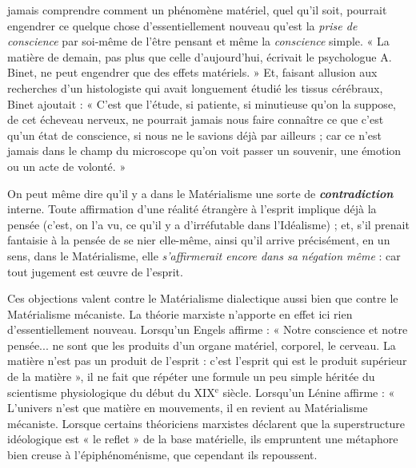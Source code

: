{jamais comprendre comment un phénomène matériel, quel qu'il soit,
pourrait engendrer ce quelque chose d’essentiellement nouveau qu'est la
{\it prise de conscience} par soi-même de l'être pensant et même la {\it conscience}
simple. « La matière de demain, pas plus que celle d’aujourd’hui, écrivait
le psychologue A. Binet, ne peut engendrer que des effets matériels. » Et,
faisant allusion aux recherches d’un histologiste qui avait longuement étudié
les tissus cérébraux, Binet ajoutait : « C’est que l'étude, si patiente, si
minutieuse qu'on la suppose, de cet écheveau nerveux, ne pourrait jamais
nous faire connaître ce que c’est qu’un état de conscience, si nous ne le
savions déjà par ailleurs ; car ce n’est jamais dans le champ du microscope
qu’on voit passer un souvenir, une émotion ou un acte de volonté. »}
\vspace{0.31cm}

On peut même dire qu’il y a dans le Matérialisme une sorte de
\textbf{\textit {contradiction}} interne. Toute affirmation d’une réalité étrangère à
l'esprit implique déjà la pensée (c’est, on l’a vu, ce qu’il y a d’irréfutable
dans l’Idéalisme) ; et, s’il prenait fantaisie à la pensée de se nier elle-même,
ainsi qu’il arrive précisément, en un sens, dans le Matérialisme,
elle {\it s’affirmerait encore dans sa négation même} : car tout jugement
est œuvre de l’esprit.

\vspace{0.24cm}
{\footnotesize Ces objections valent contre le Matérialisme dialectique aussi bien que
contre le Matérialisme mécaniste. La théorie marxiste n'apporte en effet
ici rien d’essentiellement nouveau. Lorsqu'un Engels affirme : « Notre
conscience et notre pensée... ne sont que les produits d’un organe matériel,
corporel, le cerveau. La matière n'est pas un produit de l'esprit : c'est
l'esprit qui est le produit supérieur de la matière », il ne fait que répéter
une formule un peu simple héritée du scientisme physiologique du début du
{\footnotesize XIX}$^\text{e}$ siècle. Lorsqu'un Lénine affirme : « L'univers n’est que matière
en mouvements, il en revient au Matérialisme mécaniste. Lorsque certains
théoriciens marxistes déclarent que la superstructure idéologique est « le
reflet » de la base matérielle, ils empruntent une métaphore bien creuse
à l'épiphénoménisme, que cependant ils repoussent.}
\vspace{0.31cm}

